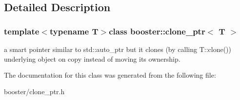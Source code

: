 \subsection{Detailed Description}
\subsubsection*{template$<$typename T$>$class booster\-::clone\-\_\-ptr$<$ T $>$}

a smart pointer similar to std\-::auto\-\_\-ptr but it clones (by calling T\-::clone()) underlying object on copy instead of moving its ownership. 

The documentation for this class was generated from the following file\-:\begin{DoxyCompactItemize}
\item 
booster/clone\-\_\-ptr.\-h\end{DoxyCompactItemize}
